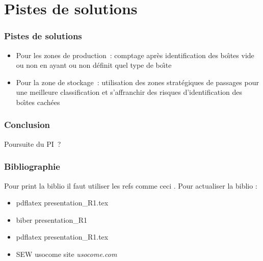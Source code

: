 \documentclass[aspectratio = 43]{beamer}
\begin{document}
\section{Pistes de solutions}
\begin{frame}
  \frametitle{Pistes de solutions}
  \begin{itemize}
  \item Pour les zones de production~: comptage apr{\`e}s identification
    des bo{\^\i}tes vide ou non en ayant ou non d{\'e}finit quel type de bo{\^\i}te
  \item Pour la zone de stockage~: utilisation des zones strat{\'e}giques
    de passages pour une meilleure classification et s'affranchir des
    risques d'identification des bo{\^\i}tes cach{\'e}es
  \end{itemize}
\end{frame}
%
\begin{frame}
  \frametitle{Conclusion}
  Poursuite du PI~?
\end{frame}
\begin{frame}
  \frametitle{Bibliographie}
  Pour print la biblio il faut utiliser les refs comme ceci
  \citeauthor{bib:ziou}. Pour actualiser la biblio :
  \begin{itemize}
  \item pdflatex presentation\_R1.tex
  \item biber presentation\_R1
  \item pdflatex presentation\_R1.tex
  \end{itemize}

  \printbibliography%

  \begin{itemize}
  \item SEW usocome site \textit{usocome.com}
  \end{itemize}
\end{frame}
\end{document}
